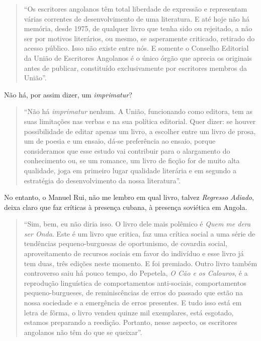\documentclass[
  letterpaper,
  DIV=11,
  numbers=noendperiod]{scrreprt}
\begin{document}
\begin{quote}
``Os escritores angolanos têm total liberdade de expressão e representam
várias correntes de desenvolvimento de uma literatura. E até hoje não há
memória, desde 1975, de qualquer livro que tenha sido ou rejeitado, a
não ser por motivos literários, ou mesmo, se asperamente criticado,
retirado do acesso público. Isso não existe entre nós. E somente o
Conselho Editorial da União de Escritores Angolanos é o único órgão que
aprecia os originais antes de publicar, constituído exclusivamente por
escritores membros da União''.
\end{quote}

Não há, por assim dizer, um \emph{imprimatur}?

\begin{quote}
``Não há \emph{imprimatur} nenhum. A União, funcionando como editora,
tem as suas limitações nas verbas e na sua política editorial. Quer
dizer: se houver possibilidade de editar apenas um livro, a escolher
entre um livro de prosa, um de poesia e um ensaio, dá-se preferência ao
ensaio, porque consideramos que esse estudo vai contribuir para o
alargamento do conhecimento ou, se um romance, um livro de ficção for de
muito alta qualidade, joga em primeiro lugar qualidade literária e em
segundo a estratégia do desenvolvimento da nossa literatura''.
\end{quote}

No entanto, o Manuel Rui, não me lembro em qual livro, talvez
\emph{Regresso Adiado}, deixa claro que faz críticas à presença cubana,
à presença soviética em Angola.

\begin{quote}
``Sim, bem, eu não diria isso. O livro dele mais polêmico é \emph{Quem
me dera ser Onda}. Este é um livro que critica, faz uma crítica social a
uma série de tendências pequeno-burguesas de oportunismo, de covardia
social, aproveitamento de recursos sociais em favor do indivíduo e esse
livro já tem duas, três edições neste momento. E foi premiado. Outro
livro também controverso saiu há pouco tempo, do Pepetela, \emph{O Cão e
os Calouros}, é a reprodução linguística de comportamentos anti-sociais,
comportamentos pequeno-burgueses, de reminiscências de erros do passado
que estão na nossa sociedade e a emergência de erros presentes. E tudo
isso está em letra de fôrma, o livro vendeu quinze mil exemplares, está
esgotado, estamos preparando a reedição. Portanto, nesse aspecto, os
escritores angolanos não têm do que se queixar''.
\end{quote}
\end{document}

